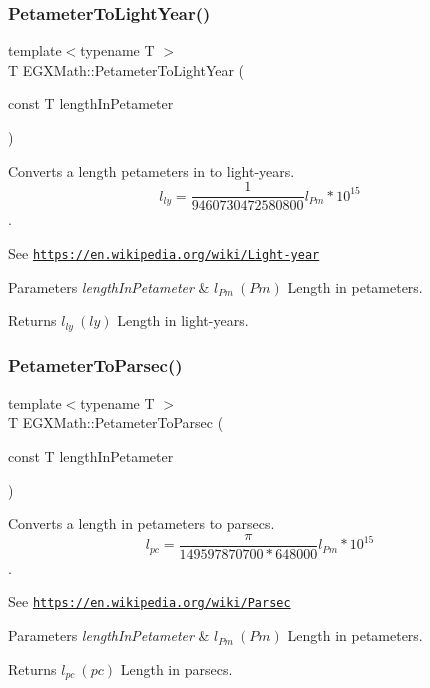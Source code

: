 \subsubsection{\texorpdfstring{Petameter\+To\+Light\+Year()}{PetameterToLightYear()}}
{\footnotesize\ttfamily template$<$typename T $>$ \\
T E\+G\+X\+Math\+::\+Petameter\+To\+Light\+Year (\begin{DoxyParamCaption}\item[{const T}]{length\+In\+Petameter }\end{DoxyParamCaption})}



Converts a length petameters in to light-\/years. \[ l_{ly}= \frac{1}{9460730472580800} l_{Pm} * 10^{15} \]. 

See \href{https://en.wikipedia.org/wiki/Light-year}{\tt https\+://en.\+wikipedia.\+org/wiki/\+Light-\/year} 
\begin{DoxyParams}{Parameters}
{\em length\+In\+Petameter} & $ l_{Pm}\ (Pm)$ Length in petameters. \\
\hline
\end{DoxyParams}
\begin{DoxyReturn}{Returns}
$ l_{ly}\ (ly)$ Length in light-\/years. 
\end{DoxyReturn}
\mbox{\label{group___e_g_x_math-_conversions-_length_conversions-_petameter-_astronomical_ga6579583b24214c285978b0e08e163a9d}} 
\subsubsection{\texorpdfstring{Petameter\+To\+Parsec()}{PetameterToParsec()}}
{\footnotesize\ttfamily template$<$typename T $>$ \\
T E\+G\+X\+Math\+::\+Petameter\+To\+Parsec (\begin{DoxyParamCaption}\item[{const T}]{length\+In\+Petameter }\end{DoxyParamCaption})}



Converts a length in petameters to parsecs. \[ l_{pc}=\frac{\pi}{149597870700 * 648000} l_{Pm} * 10^{15} \]. 

See \href{https://en.wikipedia.org/wiki/Parsec}{\tt https\+://en.\+wikipedia.\+org/wiki/\+Parsec} 
\begin{DoxyParams}{Parameters}
{\em length\+In\+Petameter} & $ l_{Pm}\ (Pm)$ Length in petameters. \\
\hline
\end{DoxyParams}
\begin{DoxyReturn}{Returns}
$ l_{pc}\ (pc)$ Length in parsecs. 
\end{DoxyReturn}
